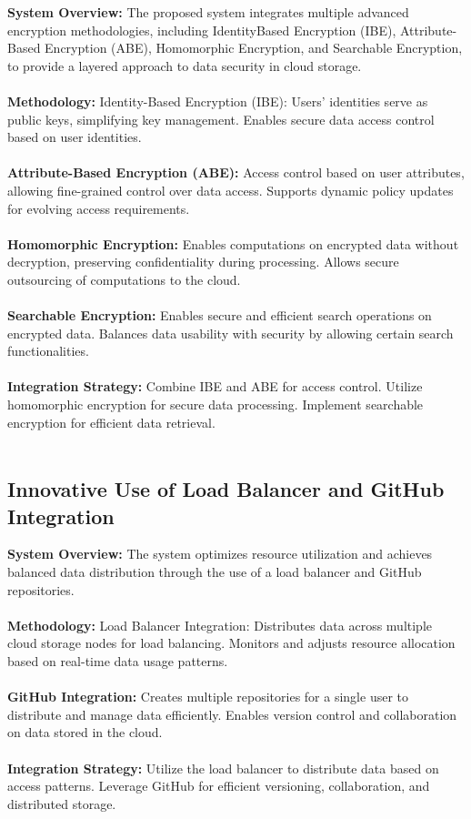 \textbf{System Overview:}
The proposed system integrates multiple advanced encryption methodologies, including IdentityBased Encryption (IBE), Attribute-Based Encryption (ABE), Homomorphic Encryption, and
Searchable Encryption, to provide a layered approach to data security in cloud storage. 
\\
\\
\textbf{Methodology:}
Identity-Based Encryption (IBE):
Users' identities serve as public keys, simplifying key management.
Enables secure data access control based on user identities. 
\\
\\
\textbf{Attribute-Based Encryption (ABE):}
Access control based on user attributes, allowing fine-grained control over data access.
Supports dynamic policy updates for evolving access requirements. 
\\
\\
\textbf{Homomorphic Encryption:}
Enables computations on encrypted data without decryption, preserving confidentiality during
processing.
Allows secure outsourcing of computations to the cloud. 
\\
\\
\textbf{Searchable Encryption:}
Enables secure and efficient search operations on encrypted data.
Balances data usability with security by allowing certain search functionalities.
\\
\\
\textbf{Integration Strategy:}
Combine IBE and ABE for access control.
Utilize homomorphic encryption for secure data processing. 
Implement searchable encryption for efficient data retrieval. 
\\
\\
\subsection{Innovative Use of Load Balancer and GitHub Integration}

\textbf{System Overview:}
The system optimizes resource utilization and achieves balanced data distribution through the use of
a load balancer and GitHub repositories. 
\\
\\
\textbf{Methodology:}
Load Balancer Integration:
Distributes data across multiple cloud storage nodes for load balancing.
Monitors and adjusts resource allocation based on real-time data usage patterns.  
\\
\\
\textbf{GitHub Integration:}
Creates multiple repositories for a single user to distribute and manage data efficiently.
Enables version control and collaboration on data stored in the cloud. 
\\
\\
\textbf{Integration Strategy: }
Utilize the load balancer to distribute data based on access patterns.
Leverage GitHub for efficient versioning, collaboration, and distributed storage. 
\\
\\
